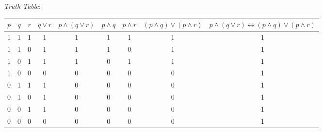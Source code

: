\begin{center}
\emph{Truth-Table}:\\[2ex]
{\small\begin{tabular}{ccc|c | c | c | c | c | c }
$p$&$q$&$r$& $q\lor r$ & $p\land (q\lor r)$ & $p\land q$ & $p\land r$ & $(p\land q)\lor (p\land r)$ & $p \land (q \lor r) \leftrightarrow (p \land q) \lor (p \land r)$
\\
\hline
 1 & 1 & 1 & 1 &1 &1 &1 &1 & 1 \\ 
 1 & 1 & 0 &1 &1 &1 &0 & 1 &1\\
 1 & 0 & 1 &1 &1 &0 &1 &1 &1 \\
 1 & 0 & 0 &0 &0 &0 &0 &0 &1 \\
 0 & 1 & 1 &1 & 0 &0 &0 &0 &1\\
 0 & 1 & 0 &1 &0 &0 &0 &0 &1 \\
 0 & 0 & 1 &1 &0 &0 &0 &0 &1 \\
 0 & 0 & 0 &0 &0 &0 &0 &0 &1 \\
\end{tabular}}
\end{center}

\vspace{1ex}

